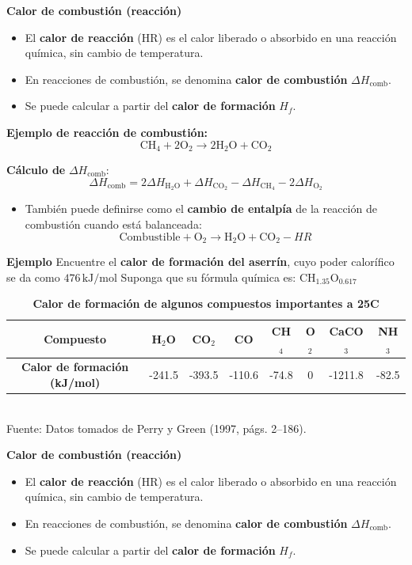 \documentclass[../../main.tex]{subfiles}
\begin{document}
\begin{frame}{\textbf{Calor de combusti\'on (reacci\'on)}}
\begin{itemize}
  \item El \textbf{calor de reacci\'on} (HR) es el calor liberado o absorbido en una reacci\'on qu\'imica, sin cambio de temperatura.
  \item En reacciones de combusti\'on, se denomina \textbf{calor de combusti\'on} \( \Delta H_{\text{comb}} \).
  \item Se puede calcular a partir del \textbf{calor de formaci\'on} \( H_f \).
\end{itemize}

\textbf{Ejemplo de reacci\'on de combusti\'on:}
\[
\text{CH}_4 + {2} \text{O}_2 \rightarrow 2 \text{H}_2\text{O} + \text{CO}_2
\]

\textbf{C\'alculo de} \( \Delta H_{\text{comb}} \):
\[
\Delta H_{\text{comb}} = 2 \Delta H_{\text{H}_2\text{O}} + \Delta H_{\text{CO}_2} - \Delta H_{\text{CH}_4} - {2} \Delta H_{\text{O}_2} 
\]

\begin{itemize}
  \item Tambi\'en puede definirse como el \textbf{cambio de entalp\'ia} de la reacci\'on de combusti\'on cuando est\'a balanceada:
\[
\text{Combustible} + \text{O}_2 \rightarrow \text{H}_2\text{O} + \text{CO}_2 - HR
\]
\end{itemize}
\end{frame}
\begin{frame}{\textbf{Ejemplo}}
Encuentre el \textbf{calor de formación del aserrín}, cuyo poder calorífico se da como \( 476\, \text{kJ/mol}
\)
Suponga que su fórmula química es:
\(
\text{CH}_{1.35}\text{O}_{0.617}
\)
\begin{table}[h!]
\centering
\caption{\textbf{Calor de formaci\'on de algunos compuestos importantes a 25\textdegree C}}
\scriptsize
\begin{tabular}{|c|c|c|c|c|c|c|c|}
\hline
\textbf{Compuesto} & H$_2$O & CO$_2$ & CO & CH$_4$ & O$_2$ & CaCO$_3$ & NH$_3$ \\
\hline
\textbf{Calor de formaci\'on (kJ/mol)} & -241.5 & -393.5 & -110.6 & -74.8 & 0 & -1211.8 & -82.5 \\
\hline
\end{tabular}
\\[0.5em]
\footnotesize Fuente: Datos tomados de Perry y Green (1997, p\'ags. 2--186).
\end{table}
\textbf{Calor de combusti\'on (reacci\'on)}
\begin{itemize}
  \item El \textbf{calor de reacci\'on} (HR) es el calor liberado o absorbido en una reacci\'on qu\'imica, sin cambio de temperatura.
  \item En reacciones de combusti\'on, se denomina \textbf{calor de combusti\'on} \( \Delta H_{\text{comb}} \).
  \item Se puede calcular a partir del \textbf{calor de formaci\'on} \( H_f \).
\end{itemize}

\end{frame}
\end{document}
